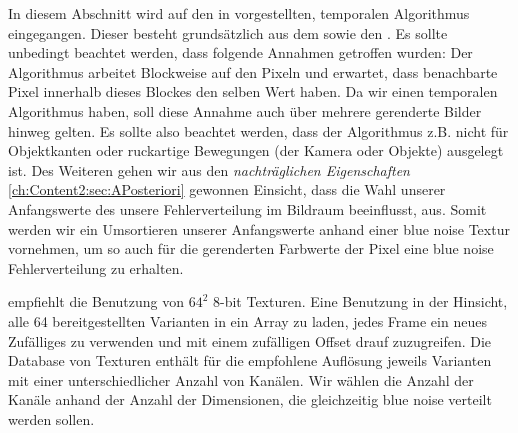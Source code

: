 In diesem Abschnitt wird auf den in \cite{hal02158423} vorgestellten, temporalen Algorithmus eingegangen.
Dieser besteht grundsätzlich aus dem  sowie den 
. Es sollte unbedingt beachtet werden, dass folgende
Annahmen getroffen wurden: Der Algorithmus arbeitet Blockweise auf den Pixeln und erwartet, dass benachbarte
Pixel innerhalb dieses Blockes den selben Wert haben. Da wir einen temporalen Algorithmus haben, soll diese Annahme 
auch über mehrere gerenderte Bilder hinweg gelten. Es sollte also beachtet werden, dass der Algorithmus z.B. nicht 
für Objektkanten oder ruckartige Bewegungen (der Kamera oder Objekte) ausgelegt ist.
Des Weiteren gehen wir aus den \textit{nachträglichen Eigenschaften}
\ref{ch:Content2:sec:APosteriori} gewonnen Einsicht, dass die Wahl 
unserer Anfangswerte des  unsere 
Fehlerverteilung im Bildraum beeinflusst, aus. Somit werden wir ein Umsortieren
unserer Anfangswerte anhand einer blue noise Textur vornehmen, um so auch 
für die gerenderten Farbwerte der Pixel eine blue noise Fehlerverteilung zu 
erhalten. 


\par
\cite{bluenoisechrisschied} empfiehlt die Benutzung von $64^{2}$ 8-bit 
Texturen. Eine Benutzung in der Hinsicht, alle 64 bereitgestellten Varianten
in ein Array zu laden, jedes Frame ein neues Zufälliges zu verwenden und
mit einem zufälligen Offset drauf zuzugreifen. Die Database von Texturen 
\cite{bluenoisechrisschied} enthält für die empfohlene Auflösung jeweils
Varianten mit einer unterschiedlicher Anzahl von Kanälen. Wir wählen
die Anzahl der Kanäle anhand der Anzahl der Dimensionen, die gleichzeitig
blue noise verteilt werden sollen.



